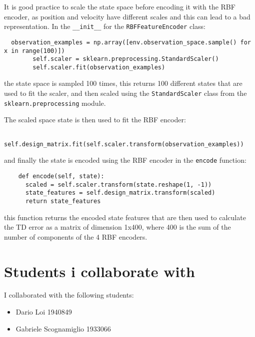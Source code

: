 \documentclass{article}
\begin{document}
It is good practice to scale the state space before encoding it with the RBF encoder,
as position and velocity have different scales and this can lead to a bad representation.
In the \texttt{\_\_init\_\_} for the \texttt{RBFFeatureEncoder} class:
\begin{verbatim}
  observation_examples = np.array([env.observation_space.sample() for x in range(100)])
        self.scaler = sklearn.preprocessing.StandardScaler()
        self.scaler.fit(observation_examples)
\end{verbatim}

the state space is sampled 100 times, this returns 100 different states that are used to fit the scaler,
and then scaled using the \texttt{StandardScaler} class from the \texttt{sklearn.preprocessing} module.

The scaled space state is then used to fit the RBF encoder:

\begin{verbatim}
    self.design_matrix.fit(self.scaler.transform(observation_examples))
\end{verbatim}

and finally the state is encoded using the RBF encoder in the \texttt{encode} function:

\begin{verbatim}
    def encode(self, state):
      scaled = self.scaler.transform(state.reshape(1, -1))
      state_features = self.design_matrix.transform(scaled)
      return state_features
\end{verbatim}

this function returns the encoded state features that are then used to calculate the TD error as a matrix
of dimension 1x400, where 400 is the sum of the number of components of the 4 RBF encoders.

\section{Students i collaborate with}
I collaborated with the following students:
\begin{itemize}
  \item Dario Loi 1940849
  \item Gabriele Scognamiglio 1933066
\end{itemize}
\end{document}
